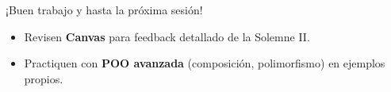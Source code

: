 \documentclass[10pt]{beamer}
\begin{document}
\begin{frame}
  \Huge{\centerline{¡Buen trabajo y hasta la próxima sesión!}}
  \vspace{0.3cm}
  \normalsize
  \begin{itemize}
    \item Revisen \textbf{Canvas} para feedback detallado de la Solemne II.
    \item Practiquen con \textbf{POO avanzada} (composición, polimorfismo) en ejemplos propios.
  \end{itemize}
\end{frame}
\end{document}
